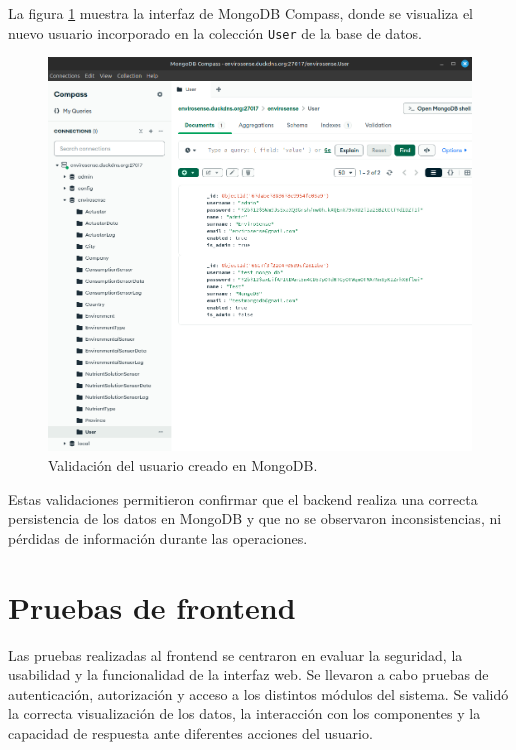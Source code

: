 La figura \ref{fig:mongodb_2} muestra la interfaz de MongoDB Compass, donde se
visualiza el nuevo usuario incorporado en la colección \texttt{User} de la base
de datos.

\begin{figure}[H]
    \centering
    \includegraphics[width=\textwidth]{Images/40_test_mongodb_2.png}
    \caption[Validación de almacenamiento en MongoDB]{Validación del usuario creado en MongoDB.}
    \label{fig:mongodb_2}
\end{figure}

Estas validaciones permitieron confirmar que el backend realiza una correcta
persistencia de los datos en MongoDB y que no se observaron inconsistencias, ni
pérdidas de información durante las operaciones.

\section{Pruebas de frontend}
\label{sec:pruebas_frontend}

Las pruebas realizadas al frontend se centraron en evaluar la seguridad, la
usabilidad y la funcionalidad de la interfaz web. Se llevaron a cabo pruebas de
autenticación, autorización y acceso a los distintos módulos del sistema. Se
validó la correcta visualización de los datos, la interacción con los
componentes y la capacidad de respuesta ante diferentes acciones del usuario.


